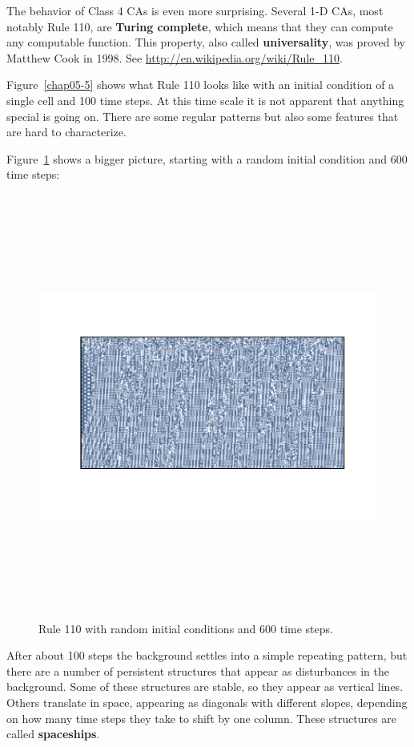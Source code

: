 \documentclass[12pt]{book}
\theoremstyle{exercise}
\begin{document}
The behavior of Class 4 CAs is even more surprising.  Several 1-D CAs,
most notably Rule 110, are {\bf Turing complete}, which means that
they can compute any computable function.  This property, also called
{\bf universality}, was proved by Matthew Cook in 1998.  See
\url{http://en.wikipedia.org/wiki/Rule_110}.


Figure~\ref{chap05-5} shows what Rule 110 looks like with an initial
condition of a single cell and 100 time steps.
At this time scale it is not apparent that anything special is
going on.  There are some regular patterns but also some features
that are hard to characterize.

Figure~\ref{chap05-6} shows a bigger picture, starting with a random
initial condition and 600 time steps:

\begin{figure}
\centerline{\includegraphics[width=5.5in,height=5.5in]{figs/chap05-6.pdf}}
\caption{Rule 110 with random initial conditions and 600 time steps.}
\label{chap05-6}
\end{figure}

After about 100 steps the background settles into a simple repeating
pattern, but there are a number of persistent structures that appear
as disturbances in the background.  Some of these structures
are stable, so they appear as vertical lines.  Others translate in
space, appearing as diagonals with different slopes, depending on
how many time steps they take to shift by one column.  These
structures are called {\bf spaceships}.
\end{document}
